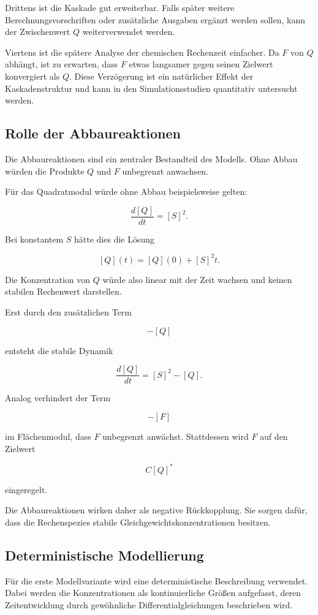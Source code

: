 Drittens ist die Kaskade gut erweiterbar. Falls später weitere
Berechnungsvorschriften oder zusätzliche Ausgaben ergänzt werden sollen,
kann der Zwischenwert \(Q\) weiterverwendet werden.

Viertens ist die spätere Analyse der chemischen Rechenzeit einfacher.
Da \(F\) von \(Q\) abhängt, ist zu erwarten, dass \(F\) etwas langsamer
gegen seinen Zielwert konvergiert als \(Q\). Diese Verzögerung ist ein
natürlicher Effekt der Kaskadenstruktur und kann in den
Simulationsstudien quantitativ untersucht werden.

\subsection{Rolle der Abbaureaktionen}

Die Abbaureaktionen sind ein zentraler Bestandteil des Modells. Ohne
Abbau würden die Produkte \(Q\) und \(F\) unbegrenzt anwachsen.

Für das Quadratmodul würde ohne Abbau beispielsweise gelten:

\[
\frac{d[Q]}{dt}=[S]^2.
\]

Bei konstantem \(S\) hätte dies die Lösung

\[
[Q](t)=[Q](0)+[S]^2t.
\]

Die Konzentration von \(Q\) würde also linear mit der Zeit wachsen und
keinen stabilen Rechenwert darstellen.

Erst durch den zusätzlichen Term

\[
-[Q]
\]

entsteht die stabile Dynamik

\[
\frac{d[Q]}{dt}=[S]^2-[Q].
\]

Analog verhindert der Term

\[
-[F]
\]

im Flächenmodul, dass \(F\) unbegrenzt anwächst. Stattdessen wird \(F\)
auf den Zielwert

\[
C[Q]^*
\]

eingeregelt.

Die Abbaureaktionen wirken daher als negative Rückkopplung. Sie sorgen
dafür, dass die Rechenspezies stabile Gleichgewichtskonzentrationen
besitzen.

\subsection{Deterministische Modellierung}

Für die erste Modellvariante wird eine deterministische Beschreibung
verwendet. Dabei werden die Konzentrationen als kontinuierliche Größen
aufgefasst, deren Zeitentwicklung durch gewöhnliche Differentialgleichungen
beschrieben wird.

